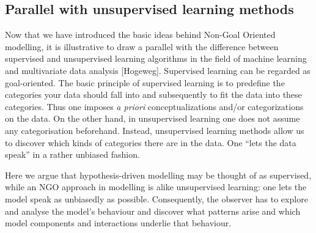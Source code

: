 \subsection{Parallel with unsupervised learning methods}

Now that we have introduced the basic ideas behind Non-Goal Oriented modelling, it is illustrative to draw a parallel with the difference between supervised and unsupervised learning algorithms in the field of machine learning and multivariate data analysis [Hogeweg]. Supervised learning can be regarded as goal-oriented. The basic principle of supervised learning is to predefine the categories your data should fall into and subsequently to fit the data into these categories. Thus one imposes \emph{a priori} conceptualizations and/or categorizations on the data. On the other hand, in unsupervised learning one does not assume any categorisation beforehand. Instead, unsupervised learning methods allow us to discover which kinds of categories there are in the data. One ``lets the data speak'' in a rather unbiased fashion. 

Here we argue that hypothesis-driven modelling may be thought of as supervised, while an NGO approach in modelling is alike unsupervised learning: one lets the model speak as unbiasedly as possible. Consequently, the observer has to explore and analyse the model’s behaviour and discover what patterns arise and which model components and interactions underlie that behaviour.